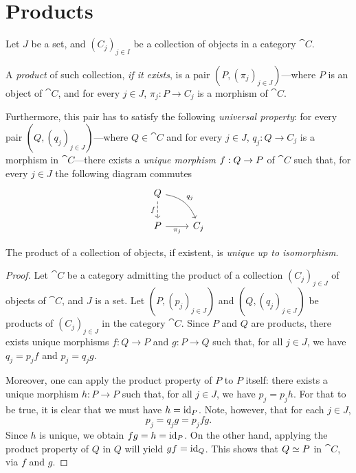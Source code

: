\section{Products}

\begin{definition}[Product]
\label{def:product}
Let \(J\) be a set, and \((C_j)_{j \in I}\) be a
collection of objects in a category \(\cat C\).

A \emph{product} of such collection, \emph{if it exists}, is a pair
\((P, (\pi_j)_{j \in J})\)---where \(P\) is an object of \(\cat C\), and for
every \(j \in J\), \(\pi_j: P \to C_j\) is a morphism of \(\cat C\).

Furthermore, this pair has to satisfy the following \emph{universal property}:
for every pair \((Q, (q_j)_{j \in J})\)---where \(Q \in \cat C\) and for every
\(j \in J\), \(q_j: Q \to C_j\) is a morphism in \(\cat C\)---there exists a
\emph{unique morphism} \(f: Q \to P\) of \(\cat C\) such that, for every
\(j \in J\) the following diagram commutes
\[
\begin{tikzcd}
Q \ar[rd, "q_j", bend left] \ar[d, dashed, "f"'] & \\
P \ar[r, "\pi_j"'] & C_j
\end{tikzcd}
\]
\end{definition}

\begin{proposition}[Uniqueness]
\label{prop:product-unique-up-to-iso}
The product of a collection of objects, if existent, is \emph{unique up to
  isomorphism}.
\end{proposition}

\begin{proof}
Let \(\cat C\) be a category admitting the product of a collection
\((C_j)_{j \in J}\) of objects of \(\cat C\), and \(J\) is a set. Let
\((P, (p_j)_{j \in J})\) and \((Q, (q_j)_{j \in J})\) be products of
\((C_j)_{j \in J}\) in the category \(\cat C\). Since \(P\) and \(Q\) are
products, there exists unique morphisms \(f: Q \to P\) and \(g: P \to Q\) such
that, for all \(j \in J\), we have \(q_j = p_j f\) and \(p_j = q_j g\).

Moreover, one can apply the product property of \(P\) to \(P\) itself: there
exists a unique morphism \(h: P \to P\) such that, for all \(j \in J\), we have
\(p_j = p_j h\). For that to be true, it is clear that we must have
\(h = \operatorname{id}_{P}\). Note, however, that for each \(j \in J\),
\[
p_j = q_j g = p_j f g.
\]
Since \(h\) is unique, we obtain \(f g = h = \operatorname{id}_P\).  On the other hand,
applying the product property of \(Q\) in \(Q\) will yield \(g f = \operatorname{id}_Q\). This
shows that \(Q \simeq P\) in \(\cat C\), via \(f\) and \(g\).
\end{proof}

